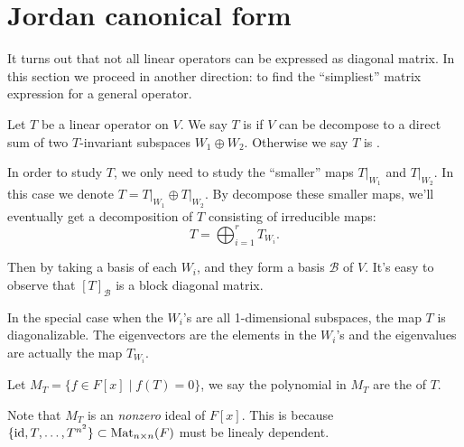 \section{Jordan canonical form}
\label{sec:Jordan canonical form}

It turns out that not all linear operators can be expressed
as diagonal matrix. In this section we proceed in another
direction: to find the ``simpliest'' matrix expression for a
general operator.

\begin{definition}
	Let $T$ be a linear operator on  $V$.
	We say  $T$ is  if $V$ can be decompose to
	a direct sum of two $T$-invariant subspaces $W_1\oplus W_2$.
	Otherwise we say $T$ is .
\end{definition}

In order to study $T$, we only need to study the ``smaller'' maps $T\big|_{W_1}$
and $T\big|_{W_2}$. In this case we denote $T = T\big|_{W_1}\oplus T\big|_{W_2}$.
By decompose these smaller maps, we'll eventually
get a decomposition of $T$ consisting of irreducible maps:
\[
T = \bigoplus_{i=1}^r T_{W_i}.
\]

Then by taking a basis of each $W_i$, and they form a basis $\mathcal{B}$ of $V$.
It's easy to observe that  $[T]_{\mathcal{B}}$ is a block diagonal matrix.

In the special case when the $W_i$'s are all 1-dimensional subspaces,
the map $T$ is diagonalizable. The eigenvectors are the elements in the
$W_i$'s and the eigenvalues are actually the map $T_{W_i}$.

\begin{definition}
	Let $M_T = \{f\in F[x]\mid f(T) = 0\}$, we say the polynomial in
	$M_T$ are the  of $T$.

	Note that $M_T$ is an \textit{nonzero} ideal of $F[x]$.
	This is because $\{\operatorname{id}, T, \dots, T^{n^2}\}\subset \mathrm{Mat}_{n \times n}(F)$
	must be linealy dependent.
\end{definition}
